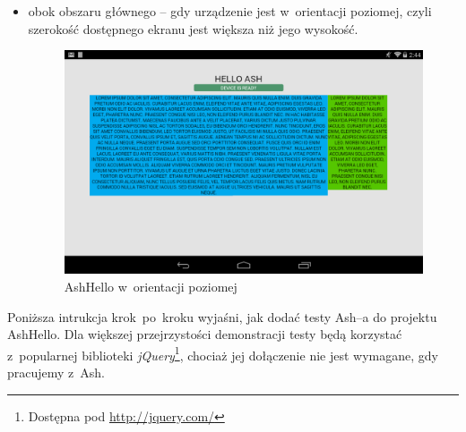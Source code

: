 \documentclass[brudnopis]{xmgr}
\begin{document}
\begin{itemize}
  \item obok obszaru głównego -- gdy urządzenie jest w~orientacji poziomej, czyli szerokość dostępnego ekranu jest większa niż jego wysokość.

\begin{figure}[h]
    \centering
    \includegraphics[scale=0.25]{hello2.png}
    \caption{AshHello w~orientacji poziomej}
    \label{fig:AshHello2}
\end{figure}
\end{itemize}

Poniższa intrukcja krok~po~kroku wyjaśni, jak dodać testy Ash--a do projektu AshHello. Dla większej przejrzystości demonstracji testy będą korzystać z~popularnej biblioteki \textit{jQuery}\footnote{Dostępna pod \url{http://jquery.com/}}, chociaż jej dołączenie nie jest wymagane, gdy pracujemy z~Ash.  
\end{document}
